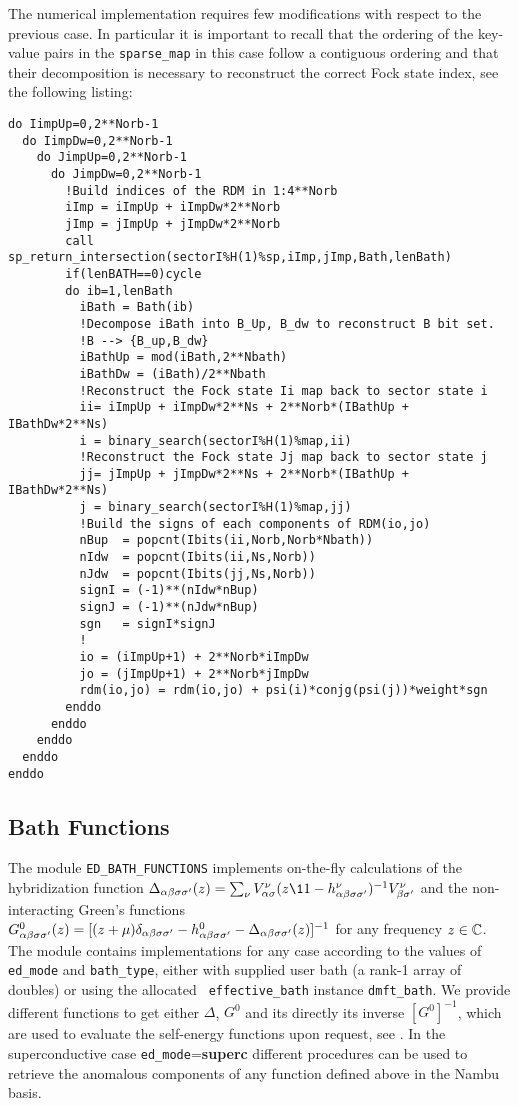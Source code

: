 \documentclass[edipack2.tex]{subfiles}
\begin{document}
The numerical implementation requires few modifications with respect
to the previous case. In particular it is important to recall that the
ordering of the key-value pairs in the {\tt sparse\_map} in this case
follow a contiguous ordering and that their decomposition is necessary
to reconstruct the correct Fock state index, see the following
listing:
\begin{lstlisting}[style=fstyle,numbers=none,basicstyle={\scriptsize\ttfamily}]
do IimpUp=0,2**Norb-1
  do IimpDw=0,2**Norb-1
    do JimpUp=0,2**Norb-1
      do JimpDw=0,2**Norb-1
        !Build indices of the RDM in 1:4**Norb
        iImp = iImpUp + iImpDw*2**Norb
        jImp = jImpUp + jImpDw*2**Norb
        call sp_return_intersection(sectorI%H(1)%sp,iImp,jImp,Bath,lenBath)
        if(lenBATH==0)cycle
        do ib=1,lenBath
          iBath = Bath(ib)
          !Decompose iBath into B_Up, B_dw to reconstruct B bit set. 
          !B --> {B_up,B_dw}
          iBathUp = mod(iBath,2**Nbath)
          iBathDw = (iBath)/2**Nbath
          !Reconstruct the Fock state Ii map back to sector state i
          ii= iImpUp + iImpDw*2**Ns + 2**Norb*(IBathUp + IBathDw*2**Ns)
          i = binary_search(sectorI%H(1)%map,ii)
          !Reconstruct the Fock state Jj map back to sector state j
          jj= jImpUp + jImpDw*2**Ns + 2**Norb*(IBathUp + IBathDw*2**Ns)
          j = binary_search(sectorI%H(1)%map,jj)
          !Build the signs of each components of RDM(io,jo)
          nBup  = popcnt(Ibits(ii,Norb,Norb*Nbath))
          nIdw  = popcnt(Ibits(ii,Ns,Norb))
          nJdw  = popcnt(Ibits(jj,Ns,Norb))
          signI = (-1)**(nIdw*nBup)
          signJ = (-1)**(nJdw*nBup)
          sgn   = signI*signJ
          !  
          io = (iImpUp+1) + 2**Norb*iImpDw
          jo = (jImpUp+1) + 2**Norb*jImpDw
          rdm(io,jo) = rdm(io,jo) + psi(i)*conjg(psi(j))*weight*sgn
        enddo
      enddo
    enddo
  enddo
enddo
\end{lstlisting}



\subsection{Bath Functions}\label{sSecFunc}
The module {\tt ED\_BATH\_FUNCTIONS} implements on-the-fly
calculations of the hybridization function $\Delta_{\a\b\s\s'}(z)=\sum_\nu
{V^\nu_{\a\s}}(z\11-h^\nu_{\a\b\s\s'})^{-1}V^\nu_{\b\s'}$ and the
non-interacting Green's functions $G^0_{\alpha\beta\sigma\sigma'}(z) =
[(z + \mu)\delta_{\alpha\beta\sigma\sigma'} - h^0_{\alpha\beta\sigma\sigma'} -
\Delta_{\alpha\beta\sigma\sigma'}(z)]^{-1}$ for any frequency $z\in\mathbb{C}$. 
The module contains implementations for any case according to the
values of {\tt ed\_mode} and {\tt bath\_type}, either with supplied
user bath (a rank-1 array of doubles) or using the allocated {\tt
  effective\_bath} instance {\tt dmft\_bath}. 
We provide different functions to get either $\Delta$, $G^0$ and its
directly its inverse $[G^0]^{-1}$, which are used to evaluate the
self-energy functions upon request, see .
In the superconductive case {\tt ed\_mode}={\bf superc} different
procedures can be used to retrieve the anomalous components of any
function defined above in the Nambu basis. 
\end{document}
